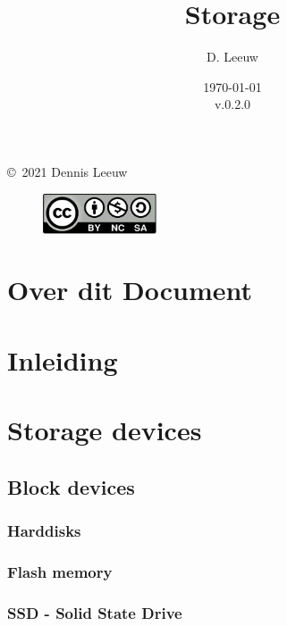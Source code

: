 \documentclass[a4paper,12pt,twoside,openright,titlepage]{book}
\author{D. Leeuw}
\title{Storage}
\date{\today\\v.0.2.0}
\begin{document}

\maketitle

\copyright\ 2021 Dennis Leeuw\\

\begin{figure}
\includegraphics[width=0.3\textwidth]{CC-BY-SA-NC.png}
\end{figure}

\bigskip




\frontmatter
\chapter{Over dit Document}



\tableofcontents

\mainmatter
\chapter{Inleiding}


\chapter{Storage devices}
\section{Block devices}

\subsection{Harddisks}

\subsection{Flash memory}

\subsection{SSD - Solid State Drive}

\end{document}
